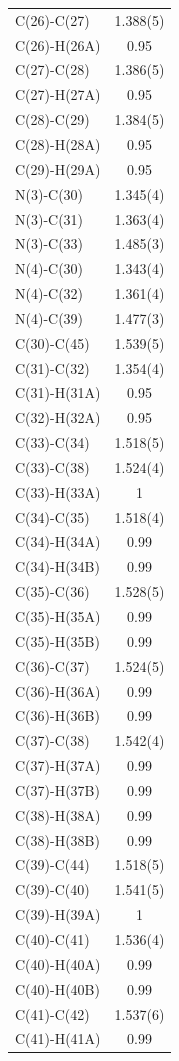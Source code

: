 \begin{center}
{\begin{supertabular}{p{1.5in}c}
C(26)-C(27) &1.388(5)\\
C(26)-H(26A) &0.95\\
C(27)-C(28) &1.386(5)\\
C(27)-H(27A) &0.95\\
C(28)-C(29) &1.384(5)\\
C(28)-H(28A) &0.95\\
C(29)-H(29A) &0.95\\
N(3)-C(30) &1.345(4)\\
N(3)-C(31) &1.363(4)\\
N(3)-C(33) &1.485(3)\\
N(4)-C(30) &1.343(4)\\
N(4)-C(32) &1.361(4)\\
N(4)-C(39) &1.477(3)\\
C(30)-C(45) &1.539(5)\\
C(31)-C(32) &1.354(4)\\
C(31)-H(31A) &0.95\\
C(32)-H(32A) &0.95\\
C(33)-C(34) &1.518(5)\\
C(33)-C(38) &1.524(4)\\
C(33)-H(33A) &1\\
C(34)-C(35) &1.518(4)\\
C(34)-H(34A) &0.99\\
C(34)-H(34B) &0.99\\
C(35)-C(36) &1.528(5)\\
C(35)-H(35A) &0.99\\
C(35)-H(35B) &0.99\\
C(36)-C(37) &1.524(5)\\
C(36)-H(36A) &0.99\\
C(36)-H(36B) &0.99\\
C(37)-C(38) &1.542(4)\\
C(37)-H(37A) &0.99\\
C(37)-H(37B) &0.99\\
C(38)-H(38A) &0.99\\
C(38)-H(38B) &0.99\\
C(39)-C(44) &1.518(5)\\
C(39)-C(40) &1.541(5)\\
C(39)-H(39A) &1\\
C(40)-C(41) &1.536(4)\\
C(40)-H(40A) &0.99\\
C(40)-H(40B) &0.99\\
C(41)-C(42) &1.537(6)\\
C(41)-H(41A) &0.99\\

\end{supertabular}}
\end{center}
